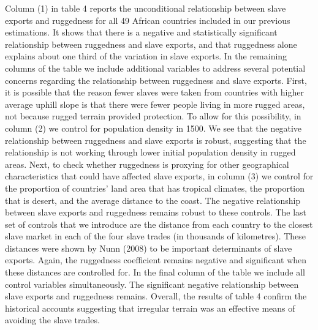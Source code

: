 \documentclass[
  letterpaper,
  DIV=11,
  numbers=noendperiod]{scrartcl}
\begin{document}
Column (1) in table 4 reports the unconditional relationship between
slave exports and ruggedness for all 49 African countries included in
our previous estimations. It shows that there is a negative and
statistically significant relationship between ruggedness and slave
exports, and that ruggedness alone explains about one third of the
variation in slave exports. In the remaining columns of the table we
include additional variables to address several potential concerns
regarding the relationship between ruggedness and slave exports. First,
it is possible that the reason fewer slaves were taken from countries
with higher average uphill slope is that there were fewer people living
in more rugged areas, not because rugged terrain provided protection. To
allow for this possibility, in column (2) we control for population
density in 1500. We see that the negative relationship between
ruggedness and slave exports is robust, suggesting that the relationship
is not working through lower initial population density in rugged areas.
Next, to check whether ruggedness is proxying for other geographical
characteristics that could have affected slave exports, in column (3) we
control for the proportion of countries' land area that has tropical
climates, the proportion that is desert, and the average distance to the
coast. The negative relationship between slave exports and ruggedness
remains robust to these controls. The last set of controls that we
introduce are the distance from each country to the closest slave market
in each of the four slave trades (in thousands of kilometres). These
distances were shown by Nunn (2008) to be important determinants of
slave exports. Again, the ruggedness coefficient remains negative and
significant when these distances are controlled for. In the final column
of the table we include all control variables simultaneously. The
significant negative relationship between slave exports and ruggedness
remains. Overall, the results of table 4 confirm the historical accounts
suggesting that irregular terrain was an effective means of avoiding the
slave trades.
\end{document}
